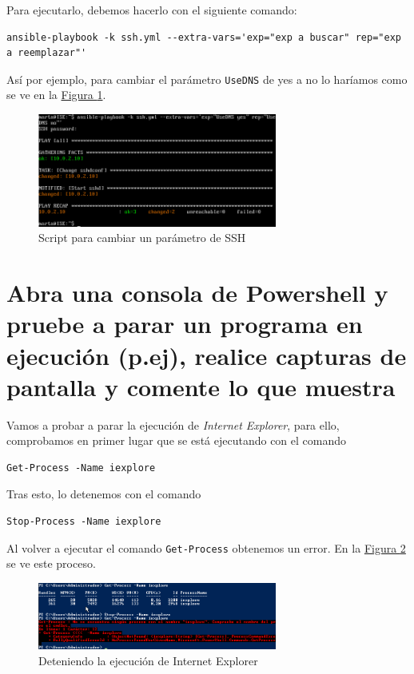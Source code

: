 \documentclass[10pt,a4paper,spanish]{article}
\numberwithin{equation}{section} %
\numberwithin{figure}{section} %
\numberwithin{table}{section} %
\begin{document}

Para ejecutarlo, debemos hacerlo con el siguiente comando:
\begin{verbatim}
ansible-playbook -k ssh.yml --extra-vars='exp="exp a buscar" rep="exp a reemplazar"'
\end{verbatim}

Así por ejemplo, para cambiar el parámetro \texttt{UseDNS} de yes a no lo haríamos como se ve en la \hyperref[ansible]{Figura \ref*{ansible}}.

\begin{figure}[!h]
    \centering
    \includegraphics[width=0.7\textwidth]{47}
    \caption{Script para cambiar un parámetro de SSH}
    \label{ansible}
\end{figure}

\section{Abra una consola de Powershell y pruebe a parar un programa en ejecución (p.ej), realice capturas de pantalla y comente lo que muestra}
Vamos a probar a parar la ejecución de \textit{Internet Explorer}, para ello, comprobamos en primer lugar que se está ejecutando con el comando

\begin{verbatim}
Get-Process -Name iexplore
\end{verbatim}

Tras esto, lo detenemos con el comando
\begin{verbatim}
Stop-Process -Name iexplore
\end{verbatim}

Al volver a ejecutar el comando \texttt{Get-Process} obtenemos un error. En la \hyperref[ie]{Figura \ref*{ie}} se ve este proceso.

\begin{figure}[!h]
    \centering
    \includegraphics[width=0.7\textwidth]{48}
    \caption{Deteniendo la ejecución de Internet Explorer}
    \label{ie}
\end{figure}  
\end{document}
